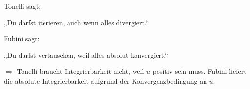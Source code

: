 \documentclass[11pt, a4paper]{article}
\begin{document}
\begin{note}
Tonelli sagt:
\begin{center}
„Du darfst iterieren, auch wenn alles divergiert.“
\end{center}
Fubini sagt:
\begin{center}
„Du darfst vertauschen, weil alles absolut konvergiert.“
\end{center}

$\Longrightarrow$ Tonelli braucht Integrierbarkeit nicht, weil $u$ positiv sein muss. Fubini liefert die absolute Integrierbarkeit aufgrund der Konvergenzbedingung an $u$.
\end{note}

\PropertyNotice
\end{document}
